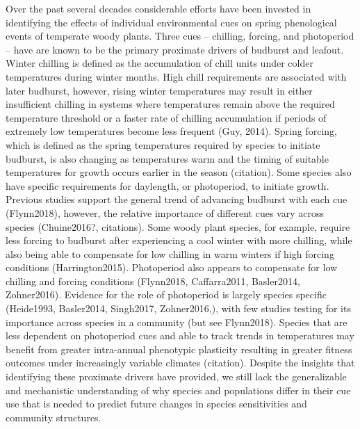 \documentclass{article}\usepackage[]{graphicx}\usepackage[]{color}
\begin{document}
Over the past several decades considerable efforts have been invested in identifying the effects of individual environmental cues on spring phenological events of temperate woody plants. Three cues -- chilling, forcing, and photoperiod -- have are known to be the primary proximate drivers of budburst and leafout. Winter chilling is defined as the accumulation of chill units under colder temperatures during winter months. High chill requirements are associated with later budburst, however, rising winter temperatures may result in either insufficient chilling in systems where temperatures remain above the required temperature threshold or a faster rate of chilling accumulation if periods of extremely low temperatures become less frequent (Guy, 2014). Spring forcing, which is defined as the spring temperatures required by species to initiate budburst, is also changing as temperatures warm and the timing of suitable temperatures for growth occurs earlier in the season (citation). Some species also have specific requirements for daylength, or photoperiod, to initiate growth. Previous studies support the general trend of advancing budburst with each cue (Flynn2018), however, the relative importance of different cues vary across species (Chuine2016?, citations). Some woody plant species, for example, require less forcing to budburst after experiencing a cool winter with more chilling, while also being able to compensate for low chilling in warm winters if high forcing conditions (Harrington2015). Photoperiod also appears to compensate for low chilling and forcing conditions (Flynn2018,  Caffarra2011, Basler2014,  Zohner2016). Evidence for the role of photoperiod is largely species specific (Heide1993, Basler2014, Singh2017, Zohner2016,), with few studies testing for its importance across species in a community (but see Flynn2018). Species that are less dependent on photoperiod cues and able to track trends in temperatures may benefit from greater intra-annual phenotypic plasticity resulting in greater fitness outcomes under increasingly variable climates (citation). Despite the insights that identifying these proximate drivers have provided, we still lack the generalizable and mechanistic understanding of why species and populations differ in their cue use that is needed to predict future changes in species sensitivities and community structures.
\end{document}
